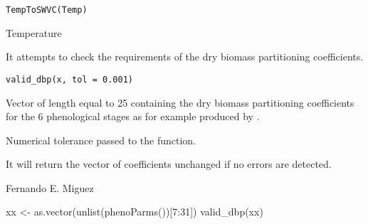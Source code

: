 \documentclass[letterpaper]{book}
\begin{document}
%
\begin{Usage}
\begin{verbatim}
TempToSWVC(Temp)
\end{verbatim}
\end{Usage}
%
\begin{Arguments}
\begin{ldescription}
\item[\code{Temp}] Temperature
\end{ldescription}
\end{Arguments}
%
\begin{Description}\relax
It attempts to check the requirements of the dry biomass
partitioning coefficients.
\end{Description}
%
\begin{Usage}
\begin{verbatim}
valid_dbp(x, tol = 0.001)
\end{verbatim}
\end{Usage}
%
\begin{Arguments}
\begin{ldescription}
\item[\code{x}] Vector of length equal to 25 containing the dry
biomass partitioning coefficients for the 6 phenological
stages as for example produced by
.

\item[\code{tol}] Numerical tolerance passed to the
 function.
\end{ldescription}
\end{Arguments}
%
\begin{Value}
It will return the vector of coefficients unchanged if no
errors are detected.
\end{Value}
%
\begin{Author}\relax
Fernando E. Miguez
\end{Author}
%
\begin{SeeAlso}\relax
{}
\end{SeeAlso}
%
\begin{Examples}
\begin{ExampleCode}
xx <- as.vector(unlist(phenoParms())[7:31])
valid_dbp(xx)
\end{ExampleCode}
\end{Examples}
\end{document}
